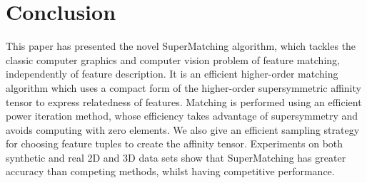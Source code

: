\section{Conclusion}
\label{sec:conclusion}

This paper has presented the novel SuperMatching algorithm,
which tackles the classic computer graphics and computer vision problem of feature matching, independently of feature description. 
It is an efficient higher-order matching algorithm which uses a compact form of the higher-order supersymmetric affinity tensor to express relatedness of features.
Matching is performed using an efficient power iteration method, whose efficiency takes advantage of supersymmetry and avoids computing with zero elements.
We also give an efficient sampling strategy for choosing feature tuples to create the affinity tensor.
Experiments on both synthetic and real 2D and 3D data sets show that
SuperMatching has greater accuracy than competing methods, whilst having competitive performance.


